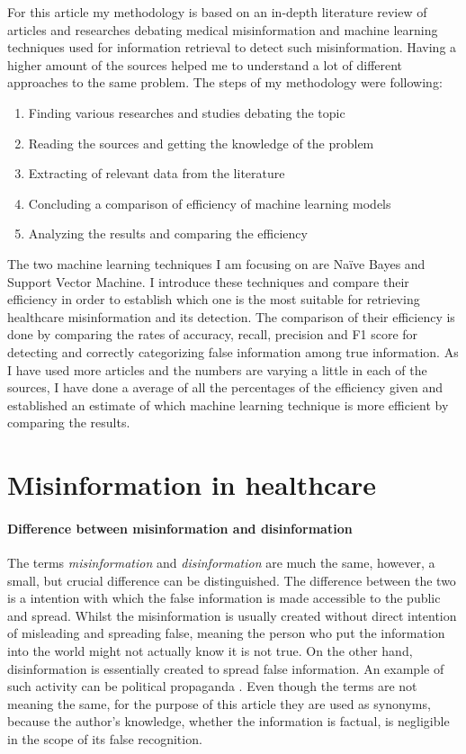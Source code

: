 \documentclass[11pt ,english,a4paper]{article}
\begin{document}
For this article my methodology is based on an in-depth literature review of articles and researches debating medical misinformation and machine learning techniques used for information retrieval to detect such misinformation. Having a higher amount of the sources helped me  to understand a lot of different approaches to the same problem. 
The steps of my methodology were following:
\begin{enumerate}
\item{Finding various researches and studies debating the topic}
\item{Reading the sources and getting the knowledge of the problem}
\item{Extracting of relevant data from the literature}
\item{Concluding a comparison of efficiency of machine learning models}
\item{Analyzing the results and comparing the efficiency}
\end{enumerate}
 The two machine learning techniques I am focusing on are Naïve Bayes and Support Vector Machine. I introduce these techniques and compare their efficiency in order to establish which one is the most suitable for retrieving healthcare misinformation and its detection. The comparison of their efficiency is done by comparing the rates of accuracy, recall, precision and F1 score for detecting and correctly categorizing false information among true information. As I have used more articles and the numbers are varying a little in each of the sources, I have done a average of all the percentages of the efficiency given and established an estimate of which machine learning technique is more efficient by comparing the results.

\section{Misinformation in healthcare}\label{mih}

\paragraph{Difference between misinformation and disinformation}
The terms \emph{misinformation} and \emph{disinformation} are much the same, however, a small, but crucial difference can be distinguished. The difference between the two is a intention with which the false information is made accessible to the public and spread. Whilst the misinformation is usually created without direct intention of misleading and spreading false, meaning the person who put the information into the world might not actually know it is not true. On the other hand, disinformation is essentially created to spread false information. An example of such activity can be political propaganda \cite{gu20misinfo} \cite{cook15misinfo}. Even though the terms are not meaning the same, for the purpose of this article they are used as synonyms, because the author's knowledge, whether the information is factual, is negligible in the scope of its false recognition.
\end{document}
